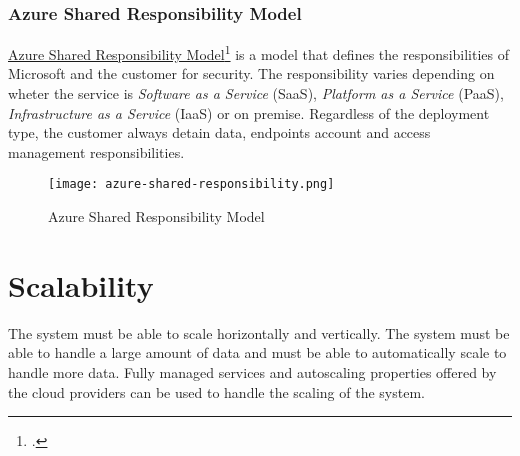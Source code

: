     \newpage
    \subsubsection{Azure Shared Responsibility Model}
    \href{https://learn.microsoft.com/en-us/azure/security/fundamentals/shared-responsibility}{Azure Shared Responsibility Model}\footcite{site:azure-shared-responsibility-model} is a model that defines the responsibilities of Microsoft and the customer for security. The responsibility varies depending on wheter the service is \textit{Software as a Service} (SaaS), \textit{Platform as a Service} (PaaS), \textit{Infrastructure as a Service} (IaaS) or on premise. Regardless of the deployment type, the customer always detain data, endpoints account and access management responsibilities.\\
    
    \begin{figure}[htbp]
        \centering
        \texttt{[image: azure-shared-responsibility.png]}
        \caption{Azure Shared Responsibility Model}
    \end{figure}

\section{Scalability}
The system must be able to scale horizontally and vertically. The system must be able to handle a large amount of data and must be able to automatically scale to handle more data. Fully managed services and autoscaling properties offered by the cloud providers can be used to handle the scaling of the system.
